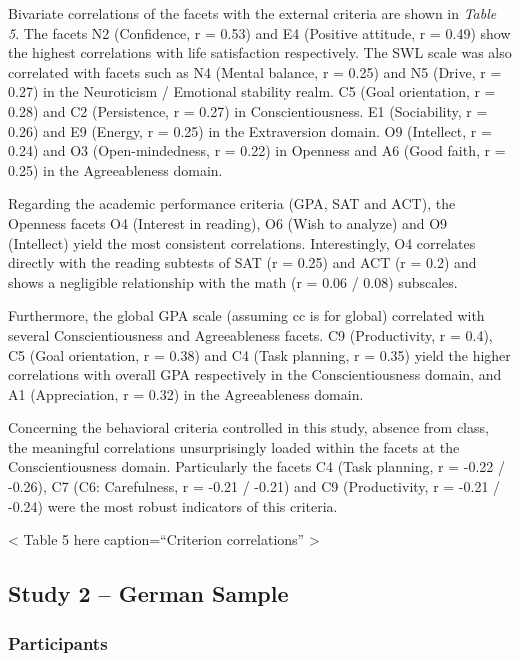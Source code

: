 \documentclass[,man,floatsintext]{apa6}
\theoremstyle{definition}
\theoremstyle{definition}
\theoremstyle{definition}
\theoremstyle{remark}
\begin{document}
Bivariate correlations of the facets with the external criteria are
shown in \emph{Table 5}. The facets N2 (Confidence, r = 0.53) and E4
(Positive attitude, r = 0.49) show the highest correlations with life
satisfaction respectively. The SWL scale was also correlated with facets
such as N4 (Mental balance, r = 0.25) and N5 (Drive, r = 0.27) in the
Neuroticism / Emotional stability realm. C5 (Goal orientation, r = 0.28)
and C2 (Persistence, r = 0.27) in Conscientiousness. E1 (Sociability, r
= 0.26) and E9 (Energy, r = 0.25) in the Extraversion domain. O9
(Intellect, r = 0.24) and O3 (Open-mindedness, r = 0.22) in Openness and
A6 (Good faith, r = 0.25) in the Agreeableness domain.

Regarding the academic performance criteria (GPA, SAT and ACT), the
Openness facets O4 (Interest in reading), O6 (Wish to analyze) and O9
(Intellect) yield the most consistent correlations. Interestingly, O4
correlates directly with the reading subtests of SAT (r = 0.25) and ACT
(r = 0.2) and shows a negligible relationship with the math (r = 0.06 /
0.08) subscales.

Furthermore, the global GPA scale (assuming cc is for global) correlated
with several Conscientiousness and Agreeableness facets. C9
(Productivity, r = 0.4), C5 (Goal orientation, r = 0.38) and C4 (Task
planning, r = 0.35) yield the higher correlations with overall GPA
respectively in the Conscientiousness domain, and A1 (Appreciation, r =
0.32) in the Agreeableness domain.

Concerning the behavioral criteria controlled in this study, absence
from class, the meaningful correlations unsurprisingly loaded within the
facets at the Conscientiousness domain. Particularly the facets C4 (Task
planning, r = -0.22 / -0.26), C7 (C6: Carefulness, r = -0.21 / -0.21)
and C9 (Productivity, r = -0.21 / -0.24) were the most robust indicators
of this criteria.

\vspace{5mm}

\textless{} Table 5 here caption=\enquote{Criterion correlations}
\textgreater{}

\vspace{5mm}

\hypertarget{study-2-german-sample}{%
\subsection{Study 2 -- German Sample}\label{study-2-german-sample}}

\hypertarget{participants-1}{%
\subsubsection{Participants}\label{participants-1}}
\end{document}
